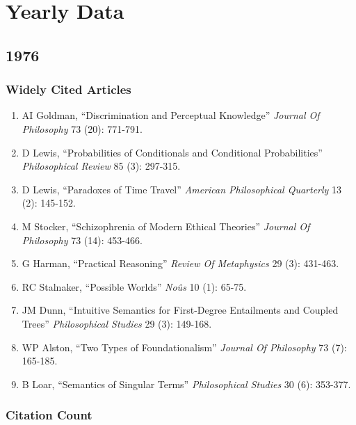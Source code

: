 \documentclass[
  10pt,
  letterpaper,
  DIV=11,
  numbers=noendperiod,
  twoside]{scrartcl}
\providecommand{\tightlist}{%
  \setlength{\itemsep}{0pt}\setlength{\parskip}{0pt}}\usepackage{longtable,booktabs,array}
\begin{document}
\section{Yearly Data}\label{yearly-data}

\subsection{1976}\label{section}

\subsubsection*{Widely Cited Articles}\label{widely-cited-articles}

\begin{enumerate}
\def\labelenumi{\arabic{enumi}.}
\tightlist
\item
  AI Goldman, ``Discrimination and Perceptual Knowledge'' \emph{Journal
  Of Philosophy} 73 (20): 771-791.
\item
  D Lewis, ``Probabilities of Conditionals and Conditional
  Probabilities'' \emph{Philosophical Review} 85 (3): 297-315.
\item
  D Lewis, ``Paradoxes of Time Travel'' \emph{American Philosophical
  Quarterly} 13 (2): 145-152.
\item
  M Stocker, ``Schizophrenia of Modern Ethical Theories'' \emph{Journal
  Of Philosophy} 73 (14): 453-466.
\item
  G Harman, ``Practical Reasoning'' \emph{Review Of Metaphysics} 29 (3):
  431-463.
\item
  RC Stalnaker, ``Possible Worlds'' \emph{Noûs} 10 (1): 65-75.
\item
  JM Dunn, ``Intuitive Semantics for First-Degree Entailments and
  Coupled Trees'' \emph{Philosophical Studies} 29 (3): 149-168.
\item
  WP Alston, ``Two Types of Foundationalism'' \emph{Journal Of
  Philosophy} 73 (7): 165-185.
\item
  B Loar, ``Semantics of Singular Terms'' \emph{Philosophical Studies}
  30 (6): 353-377.
\end{enumerate}

\subsubsection*{Citation Count}\label{citation-count}
\end{document}
